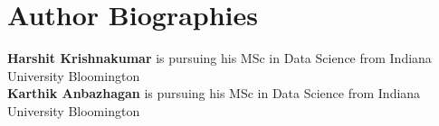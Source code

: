 \documentclass[9pt,twocolumn,twoside]{../../styles/osajnl}
\begin{document}

 
\section*{Author Biographies}
\begingroup
\setlength\intextsep{0pt}
\begin{minipage}[t][3.2cm][t]{1.0\columnwidth} %
{\bfseries Harshit Krishnakumar} is pursuing his MSc in Data Science from
Indiana University Bloomington\\
{\bfseries Karthik Anbazhagan} is pursuing his MSc in Data Science from
Indiana University Bloomington
\end{minipage}
\endgroup
\end{document}
